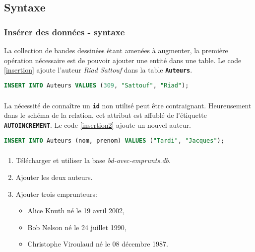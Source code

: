\documentclass[svgnames,11pt]{beamer}
\begin{document}
\subsection{Syntaxe}
\begin{frame}[fragile]
    \frametitle{Insérer des données - syntaxe}

    La collection de bandes dessinées étant amenées à augmenter, la première opération nécessaire est de pouvoir ajouter une entité dans une table. Le code \ref{insertion} ajoute l'auteur \emph{Riad Sattouf} dans la table \texttt{\textbf{Auteurs}}.
    \begin{center}
        \begin{lstlisting}[language=SQL , basicstyle=\ttfamily\small, xleftmargin=1em, xrightmargin=-1em]
INSERT INTO Auteurs VALUES (309, "Sattouf", "Riad");
\end{lstlisting}
        \label{insertion}
    \end{center}

\end{frame}
\begin{frame}[fragile]
    \frametitle{}

    La nécessité de connaître un \textbf{\texttt{id}} non utilisé peut être contraignant. Heureusement dans le schéma de la relation, cet attribut est affublé de l'étiquette \texttt{\textbf{AUTOINCREMENT}}. Le code \ref{insertion2} ajoute un nouvel auteur.

    \begin{center}
        \begin{lstlisting}[language=SQL , basicstyle=\ttfamily\small, xleftmargin=1em, xrightmargin=0em]
INSERT INTO Auteurs (nom, prenom) VALUES ("Tardi", "Jacques");
\end{lstlisting}
        \label{insertion2}
    \end{center}

\end{frame}
\begin{frame}
    \frametitle{}

    \begin{activite}
        \begin{enumerate}
            \item Télécharger et utiliser la base \emph{bd-avec-emprunts.db}.
            \item Ajouter les deux auteurs.
            \item Ajouter trois emprunteurs:
                  \begin{itemize}
                      \item Alice Knuth né le 19 avril 2002,
                      \item Bob Nelson né le 24 juillet 1990,
                      \item Christophe Viroulaud né le 08 décembre 1987.
                  \end{itemize}
        \end{enumerate}
    \end{activite}

\end{frame}
\end{document}
